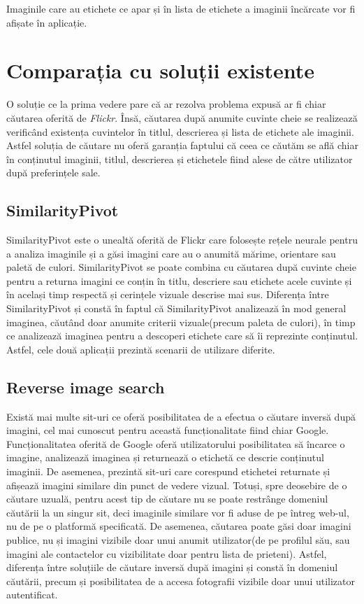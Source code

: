 Imaginile care au etichete ce apar și în lista de etichete a imaginii încărcate vor fi afișate în aplicație.

\section{Comparația cu soluții existente}

O soluție ce la prima vedere pare că ar rezolva problema expusă ar fi chiar căutarea oferită de \textit{Flickr}. Însă, căutarea după anumite cuvinte cheie se realizează verificând existența cuvintelor în titlul, descrierea și lista de etichete ale imaginii. Astfel soluția de căutare nu oferă garanția faptului că ceea ce căutăm se află chiar în conținutul imaginii, titlul, descrierea și etichetele fiind alese de către utilizator după preferințele sale.

\subsection{SimilarityPivot}
SimilarityPivot este o unealtă oferită de Flickr care folosește rețele neurale pentru a analiza imaginile și a găsi imagini care au o anumită mărime, orientare sau paletă de culori. SimilarityPivot se poate combina cu căutarea după cuvinte cheie pentru a returna imagini ce conțin în titlu, descriere sau etichete acele cuvinte și în același timp respectă și cerințele vizuale descrise mai sus. Diferența între SimilarityPivot și {\applicationtitle} constă în faptul că SimilarityPivot analizează în mod general imaginea, căutând doar anumite criterii vizuale(precum paleta de culori), în timp ce {\applicationtitle} analizează imaginea pentru a descoperi etichete care să îi reprezinte conținutul. Astfel, cele două aplicații prezintă scenarii de utilizare diferite.

\subsection{Reverse image search}
Există mai multe sit-uri ce oferă posibilitatea de a efectua o căutare inversă după imagini, cel mai cunoscut pentru această funcționalitate fiind chiar Google. Funcționalitatea oferită de Google oferă utilizatorului posibilitatea să încarce o imagine, analizează imaginea și returnează o etichetă ce descrie conținutul imaginii. De asemenea, prezintă sit-uri care corespund etichetei returnate și afișează imagini similare din punct de vedere vizual. Totuși, spre deosebire de o căutare uzuală, pentru acest tip de căutare nu se poate restrânge domeniul căutării la un singur sit, deci imaginile similare vor fi aduse de pe întreg web-ul, nu de pe o platformă specificată. De asemenea, căutarea poate găsi doar imagini publice, nu și imagini vizibile doar unui anumit utilizator(de pe profilul său, sau imagini ale contactelor cu vizibilitate doar pentru lista de prieteni). Astfel, diferența între soluțiile de căutare inversă după imagini și {\applicationtitle} constă în domeniul căutării, precum și posibilitatea {\applicationtitle} de a accesa fotografii vizibile doar unui utilizator autentificat.


